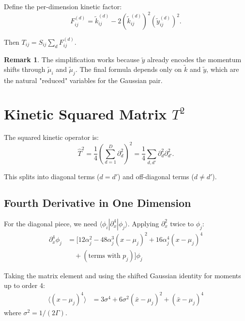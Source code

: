 \documentclass[11pt,a4paper]{article}
\theoremstyle{definition}
\newtheorem{remark}{Remark}
\begin{document}
Define the per-dimension kinetic factor:
\begin{equation}
F_{ij}^{(d)} = \tilde{k}_{ij}^{(d)} - 2 (\tilde{k}_{ij}^{(d)})^2 (\tilde{y}_{ij}^{(d)})^2.
\end{equation}

Then $T_{ij} = S_{ij} \sum_d F_{ij}^{(d)}$.

\begin{remark}
The simplification works because $\tilde{y}$ already encodes the momentum shifts through $\tilde{\mu}_i$ and $\tilde{\mu}_j$. The final formula depends only on $\tilde{k}$ and $\tilde{y}$, which are the natural "reduced" variables for the Gaussian pair.
\end{remark}

\section{Kinetic Squared Matrix $T^2$}

The squared kinetic operator is:
\begin{equation}
\hat{T}^2 = \frac{1}{4} \left( \sum_{d=1}^{D} \partial_d^2 \right)^2 = \frac{1}{4} \sum_{d,d'} \partial_d^2 \partial_{d'}^2.
\end{equation}

This splits into diagonal terms ($d = d'$) and off-diagonal terms ($d \neq d'$).

\subsection{Fourth Derivative in One Dimension}

For the diagonal piece, we need $\langle \phi_i | \partial_x^4 | \phi_j \rangle$. Applying $\partial_x^2$ twice to $\phi_j$:
\begin{align}
\partial_x^4 \phi_j &= \Big[ 12\alpha_j^2 - 48\alpha_j^3(x-\mu_j)^2 + 16\alpha_j^4(x-\mu_j)^4 \\
&\quad + (\text{terms with } p_j) \Big] \phi_j \nonumber
\end{align}

Taking the matrix element and using the shifted Gaussian identity for moments up to order 4:
\begin{align}
\langle (x-\mu_j)^4 \rangle &= 3\sigma^4 + 6\sigma^2(\bar{x}-\mu_j)^2 + (\bar{x}-\mu_j)^4
\end{align}
where $\sigma^2 = 1/(2\Gamma)$.
\end{document}
